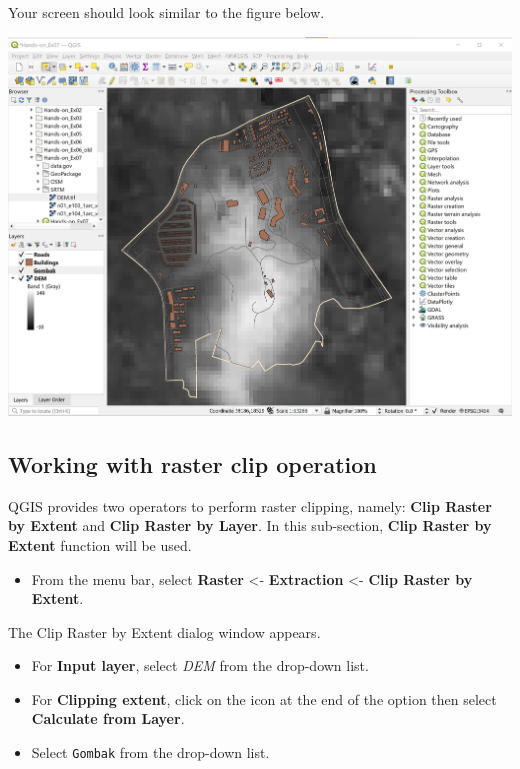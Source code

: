 \documentclass[
  letterpaper,
  DIV=11,
  numbers=noendperiod]{scrreprt}
\providecommand{\tightlist}{%
  \setlength{\itemsep}{0pt}\setlength{\parskip}{0pt}}\usepackage{longtable,booktabs,array}
\begin{document}
Your screen should look similar to the figure below.

\includegraphics{./img07/image19.jpg}

\hypertarget{working-with-raster-clip-operation}{%
\subsection{Working with raster clip
operation}\label{working-with-raster-clip-operation}}

QGIS provides two operators to perform raster clipping, namely:
\textbf{Clip Raster by Extent} and \textbf{Clip Raster by Layer}. In
this sub-section, \textbf{Clip Raster by Extent} function will be used.

\begin{itemize}
\tightlist
\item
  From the menu bar, select \textbf{Raster} \textless-
  \textbf{Extraction} \textless- \textbf{Clip Raster by Extent}.
\end{itemize}

The Clip Raster by Extent dialog window appears.

\begin{itemize}
\tightlist
\item
  For \textbf{Input layer}, select \emph{DEM} from the drop-down list.
\item
  For \textbf{Clipping extent}, click on the icon at the end of the
  option then select \textbf{Calculate from Layer}.
\item
  Select \texttt{Gombak} from the drop-down list.
\end{itemize}
\end{document}
